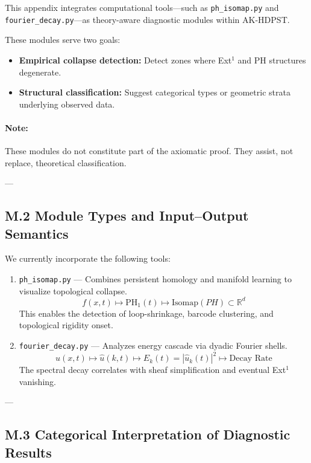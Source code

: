 \documentclass[11pt]{article}
\begin{document}
This appendix integrates computational tools—such as \texttt{ph\_isomap.py} and \texttt{fourier\_decay.py}—as theory-aware diagnostic modules within AK-HDPST.

These modules serve two goals:
\begin{itemize}
  \item \textbf{Empirical collapse detection:} Detect zones where Ext$^1$ and PH structures degenerate.
  \item \textbf{Structural classification:} Suggest categorical types or geometric strata underlying observed data.
\end{itemize}

\paragraph{Note:} These modules do not constitute part of the axiomatic proof. They assist, not replace, theoretical classification.

---

\subsection*{M.2 Module Types and Input–Output Semantics}

We currently incorporate the following tools:

\begin{enumerate}
  \item \texttt{ph\_isomap.py} — Combines persistent homology and manifold learning to visualize topological collapse.
    \[
    f(x,t) \mapsto \mathrm{PH}_1(t) \mapsto \text{Isomap}(PH) \subset \mathbb{R}^d
    \]
    This enables the detection of loop-shrinkage, barcode clustering, and topological rigidity onset.

  \item \texttt{fourier\_decay.py} — Analyzes energy cascade via dyadic Fourier shells.
    \[
    u(x,t) \mapsto \widehat{u}(k,t) \mapsto E_k(t) = |\widehat{u}_k(t)|^2 \mapsto \text{Decay Rate}
    \]
    The spectral decay correlates with sheaf simplification and eventual Ext$^1$ vanishing.
\end{enumerate}

---

\subsection*{M.3 Categorical Interpretation of Diagnostic Results}
\end{document}
